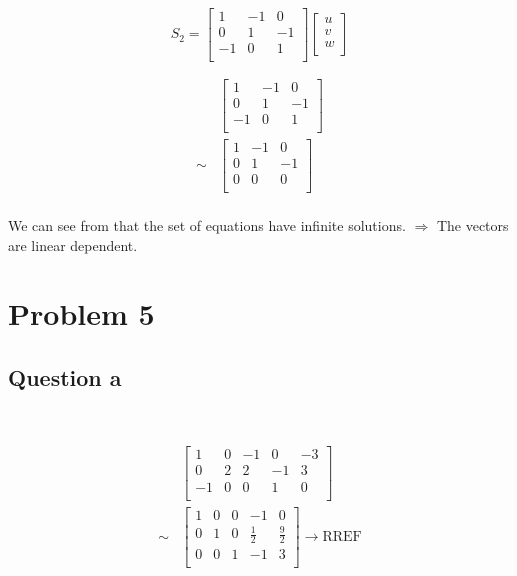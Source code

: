 \documentclass{article}
\begin{document}
~

\begin{equation}
\tag{4.2-1}
S_2=\begin{bmatrix}
1&-1&0\\
0&1&-1\\
-1&0&1\\
\end{bmatrix}
\begin{bmatrix}
u\\
v\\
w\\
\end{bmatrix}
\end{equation}

\begin{equation}
\tag{4.2-2}
\begin{split}
&\begin{bmatrix}
1&-1&0\\
0&1&-1\\
-1&0&1\\
\end{bmatrix}\\
\sim &\begin{bmatrix}
1&-1&0\\
0&1&-1\\
0&0&0\\
\end{bmatrix}\\
\end{split}
\end{equation}

We can see from that the set of equations have infinite solutions.
$\Rightarrow$ The vectors are linear dependent.

\newpage

\section{Problem 5}

\subsection{Question a}

~

\begin{equation}
\tag{5.1}
\begin{split}
&\begin{bmatrix}
1&0&-1&0&-3\\
0&2&2&-1&3\\
-1&0&0&1&0\\
\end{bmatrix}\\
\sim & \begin{bmatrix}
1&0&0&-1&0\\
0&1&0&\frac{1}{2}&\frac{9}{2}\\
0&0&1&-1&3\\
\end{bmatrix} \rightarrow \text{RREF}\\
\end{split}
\end{equation}
\end{document}
